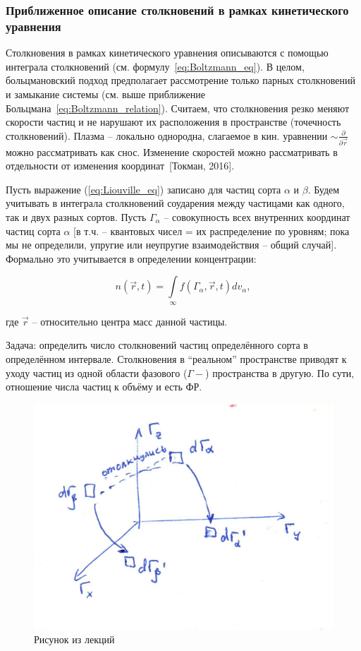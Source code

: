 \documentclass[10pt, a4paper]{article}
\newcommand{\Tokman}{~[Токман, 2016]}
\begin{document}
\subsubsection{Приближенное описание столкновений в рамках кинетического уравнения}

Столкновения в рамках кинетического уравнения описываются с помощью интеграла столкновений (см. формулу~\ref{eq:Boltzmann_eq}). В целом, больцмановский подход предполагает рассмотрение только парных столкновений и замыкание системы (см. выше приближение Больцмана~\ref{eq:Boltzmann_relation}). Считаем, что столкновения резко меняют скорости частиц и не нарушают их расположения в пространстве (точечность столкновений). Плазма -- локально однородна, слагаемое в кин. уравнении $\sim \frac{\partial}{\partial \vec{r}}$ можно рассматривать как снос. Изменение скоростей можно рассматривать в отдельности от изменения координат\Tokman.

Пусть выражение (\ref{eq:Liouville_eq}) записано для частиц сорта $\alpha$ и $\beta$. Будем учитывать в интеграла столкновений соударения между частицами как одного, так и двух разных сортов. Пусть $\Gamma_\alpha$ -- совокупность всех внутренних координат частиц сорта $\alpha$ [в т.ч. -- квантовых чисел = их распределение по уровням; пока мы не определили, упругие или неупругие взаимодействия -- общий случай]. Формально это учитывается в определении концентрации:

\begin{equation*}
	n(\vec{r}, t) = \int\limits_{\infty}f(\Gamma_\alpha,\vec{r},t)dv_\alpha,
\end{equation*}

где $\vec{r}$ -- относительно центра масс данной частицы.

Задача: определить число столкновений частиц определённого сорта в определённом интервале. Столкновения в ``реальном'' пространстве приводят к уходу частиц из одной области фазового ($\Gamma-$) пространства в другую. По сути, отношение числа частиц к объёму и есть ФР.

\begin{figure}[h!]
	\begin{center}
		\includegraphics[width=0.45\linewidth]{boltzmann_collision_term.pdf}
	\end{center}
	\caption{Рисунок из лекций}
	\label{fig:boltzmann_collision_term}
\end{figure}
\end{document}
